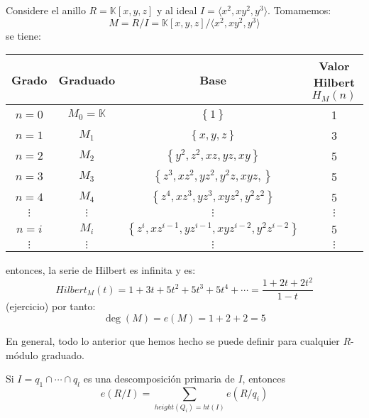 \documentclass[12pt]{report}
\newcounter{it}
\theoremstyle{largebreak}
\begin{document}
    \begin{exa}
        Considere el anillo $R=\mathbb{K}[x,y,z]$ y al ideal $I=\langle x^2,xy^2,y^3\rangle$. Tomamemos:
        \begin{equation*}
            M=R/I=\mathbb{K}[x,y,z]/\langle x^2,xy^2,y^3\rangle
        \end{equation*}
        se tiene:
        \begin{center}
            \begin{tabular}{c | c | c | c}
                Grado & Graduado & Base & Valor Hilbert $H_M(n)$ \\
                \hline
                $n=0$ & $M_0=\mathbb{K}$ & $\left\{1 \right\}$ & 1 \\
                $n=1$ & $M_1$ & $\left\{x,y,z \right\}$ & 3 \\
                $n=2$ & $M_2$ & $\left\{y^2,z^2,xz,yz,xy \right\}$ & 5 \\
                $n=3$ & $M_3$ & $\left\{z^3,xz^2,yz^2,y^2z,xyz, \right\}$ & 5 \\
                $n=4$ & $M_4$ & $\left\{z^4,xz^3,yz^3,xyz^2,y^2z^2\right\}$ & 5 \\
                $\vdots$ & $\vdots$ & $\vdots$ & $\vdots$ \\
                $n=i$ & $M_i$ & $\left\{z^i,xz^{ i-1},yz^{ i-1},xyz^{ i-2},y^2z^{ i-2}\right\}$ & 5 \\
                $\vdots$ & $\vdots$ & $\vdots$ & $\vdots$ \\
            \end{tabular}
        \end{center}
        entonces, la serie de Hilbert es infinita y es:
        \begin{equation*}
            Hilbert_M(t)=1+3t+5t^2+5t^3+5t^4+\cdots=\frac{1+2t+2t^2}{1-t}
        \end{equation*}
        (ejercicio) por tanto:
        \begin{equation*}
            \deg(M)=e(M)=1+2+2=5
        \end{equation*}
    \end{exa}

    En general, todo lo anterior que hemos hecho se puede definir para cualquier $R$-módulo graduado.

    \begin{propo}
        Si $I=q_1\cap\cdots\cap q_l$ es una descomposición primaria de $I$, entonces
        \begin{equation*}
            e(R/I)=\sum_{height(Q_i)=ht(I)}e(R/q_i)
        \end{equation*}
    \end{propo}
\end{document}
